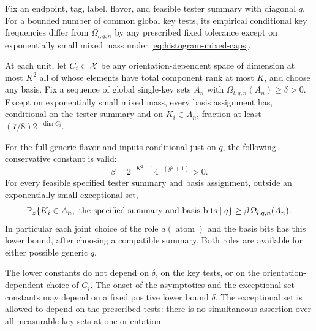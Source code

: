 \begin{lemma}
\label{lem:unary-positivity}
Fix an endpoint, tag, label, flavor, and feasible tester summary with
diagonal $q$. For a bounded number of common global key tests, its
empirical conditional key frequencies differ from
$\Omega_{l,q,n}$ by any prescribed fixed tolerance except on
exponentially small mixed mass under
\eqref{eq:histogram-mixed-caps}.

At each unit, let $C_i\subset\mathcal X$ be any orientation-dependent space
of dimension at most $K^2$ all of whose elements have total component
rank at most $K$, and choose any basis. Fix a sequence of global
single-key sets $A_n$ with
$\Omega_{l,q,n}(A_n)\ge\delta>0$. Except on exponentially small mixed
mass, every basis assignment has, conditional on the tester summary
and on $K_i\in A_n$, fraction at least
$(7/8)2^{-\dim C_i}$.

For the full generic flavor and inputs conditional just on $q$, the
following conservative constant is valid:
\begin{equation}\label{eq:uniform-base-fraction}
 \beta=2^{-K^2-1}4^{-(g^2+1)}>0.
\end{equation}
For every feasible specified tester summary and basis assignment,
outside an exponentially small exceptional set,
\begin{equation}\label{eq:histogram-base-cell-lower}
 \mathbb P_z\{K_i\in A_n,\ \text{the specified summary and basis bits}\mid q\}
 \ge\beta\,\Omega_{l,q,n}(A_n).
\end{equation}
In particular each joint choice of the role $a(\operatorname{atom})$
and the basis bits has this lower bound, after choosing a compatible
summary. Both roles are available for either possible generic $q$.

The lower constants do not depend on $\delta$, on the key tests, or on
the orientation-dependent choice of $C_i$. The onset of the
asymptotics and the exceptional-set constants may depend on a fixed
positive lower bound $\delta$. The exceptional set is allowed to
depend on the prescribed tests: there is no simultaneous assertion
over all measurable key sets at one orientation.
\end{lemma}

